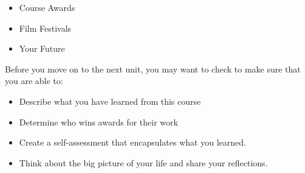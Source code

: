 \documentclass[
  letterpaper,
  DIV=11,
  numbers=noendperiod]{scrreprt}
\providecommand{\tightlist}{%
  \setlength{\itemsep}{0pt}\setlength{\parskip}{0pt}}\usepackage{longtable,booktabs,array}
\begin{document}
\begin{itemize}
\tightlist
\item
  Course Awards
\item
  Film Festivals
\item
  Your Future
\end{itemize}

\begin{tcolorbox}[enhanced jigsaw, titlerule=0mm, leftrule=.75mm, bottomrule=.15mm, colback=white, left=2mm, opacitybacktitle=0.6, title={Checking Your Learning}, colbacktitle=quarto-callout-note-color!10!white, colframe=quarto-callout-note-color-frame, bottomtitle=1mm, toptitle=1mm, opacityback=0, rightrule=.15mm, breakable, arc=.35mm, toprule=.15mm, coltitle=black]

Before you move on to the next unit, you may want to check to make sure
that you are able to:

\begin{itemize}
\tightlist
\item
  Describe what you have learned from this course
\item
  Determine who wins awards for their work
\item
  Create a self-assessment that encapsulates what you learned.
\item
  Think about the big picture of your life and share your reflections.
\end{itemize}

\end{tcolorbox}
\end{document}

